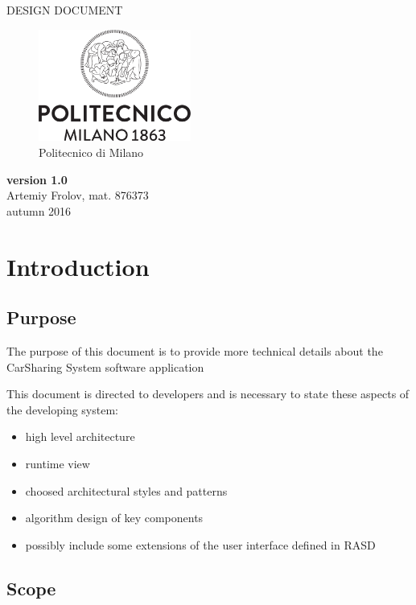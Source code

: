 \documentclass[12pt, letterpaper]{article}
\begin{document}
\begin{titlepage}
\centering
{\Large DESIGN DOCUMENT} \\
\begin{figure}[h]
\centering
\includegraphics[width=5cm]{Logo_Politecnico_Milano.png}
\caption{Politecnico di Milano}
\label{fig:PoliMi}
\end{figure}
\textbf{version 1.0} \\
\vspace{0.5cm}
Artemiy Frolov, mat. 876373 \\
\vspace{0.5cm}
autumn 2016
\end{titlepage}


\tableofcontents{}

\newpage

\section{Introduction}
\subsection{Purpose}

The purpose of this document is to provide more technical details about the CarSharing System software application 

This document is directed to developers and is necessary to state these aspects of the developing system: 
\begin{itemize}
	\item high level architecture 
	\item runtime view 
	\item choosed architectural styles and patterns
	\item algorithm design of key components 
	\item possibly include some extensions of the user interface defined in RASD 
\end{itemize}

\subsection{Scope}
\end{document}
